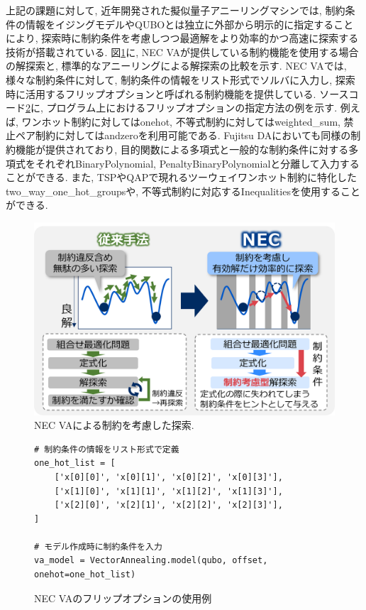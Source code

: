 \documentclass[submit,techrep,noauthor]{ipsj}
\newcounter{sourcecodefigure}
\newcounter{normalfigure}
\newcommand{\switchtosourcecode}{%
    \setcounter{normalfigure}{\value{figure}}
    \setcounter{figure}{\value{sourcecodefigure}}
}
\newcommand{\switchtonormal}{%
    \setcounter{sourcecodefigure}{\value{figure}}
    \setcounter{figure}{\value{normalfigure}}
}
\newcommand\sourcecodeposition{h}
\newenvironment{sourcecode}[1][h]{%
    \begin{figure}[#1]
    \renewcommand\sourcecodeposition{#1}
    \centering
    \captionsetup{name=ソースコード}
    \switchtosourcecode
    \ifthenelse{\equal{\sourcecodeposition}{t}}%
        {\vspace{-1.3zh}} %
        {\ifthenelse{\equal{\sourcecodeposition}{b}}%
            {\vspace{-2zh}} %
            {\vspace{-2zh}} %
    }
}{%
    \ifthenelse{\equal{\sourcecodeposition}{t}}%
        {\vspace{-1.3zh}} %
        {\ifthenelse{\equal{\sourcecodeposition}{b}}%
            {\vspace{-1zh}} %
            {\vspace{-3zh}} %
    }
    \switchtonormal
    \end{figure}
}
\begin{document}
上記の課題に対して, 近年開発された擬似量子アニーリングマシンでは, 制約条件の情報をイジングモデルやQUBOとは独立に外部から明示的に指定することにより, 探索時に制約条件を考慮しつつ最適解をより効率的かつ高速に探索する技術が搭載されている. 図\ref{va_search}に, NEC VAが提供している制約機能を使用する場合の解探索と, 標準的なアニーリングによる解探索の比較を示す. NEC VAでは, 様々な制約条件に対して, 制約条件の情報をリスト形式でソルバに入力し, 探索時に活用するフリップオプションと呼ばれる制約機能を提供している. ソースコード\ref{code:nec_va}に, プログラム上におけるフリップオプションの指定方法の例を示す. 例えば, ワンホット制約に対してはonehot, 不等式制約に対してはweighted\_sum, 禁止ペア制約に対してはandzeroを利用可能である. Fujitsu DAにおいても同様の制約機能が提供されており, 目的関数による多項式と一般的な制約条件に対する多項式をそれぞれBinaryPolynomial, PenaltyBinaryPolynomialと分離して入力することができる. また, TSPやQAPで現れるツーウェイワンホット制約に特化したtwo\_way\_one\_hot\_groupsや, 不等式制約に対応するInequalitiesを使用することができる.

\begin{figure}[hb]
\centering
\includegraphics[bb=0 0 775 250, width=15cm]{NEC_VA_flip_option.png}
\caption{NEC VAによる制約を考慮した探索.}
\label{va_search}
\end{figure}

\begin{sourcecode}[h] %
\caption{NEC VAのフリップオプションの使用例}\label{code:nec_va}
\begin{lstlisting}
# 制約条件の情報をリスト形式で定義
one_hot_list = [
    ['x[0][0]', 'x[0][1]', 'x[0][2]', 'x[0][3]'],
    ['x[1][0]', 'x[1][1]', 'x[1][2]', 'x[1][3]'],
    ['x[2][0]', 'x[2][1]', 'x[2][2]', 'x[2][3]'],
]

# モデル作成時に制約条件を入力
va_model = VectorAnnealing.model(qubo, offset, onehot=one_hot_list)
\end{lstlisting}
\vspace{5mm}
\end{sourcecode}
\end{document}
